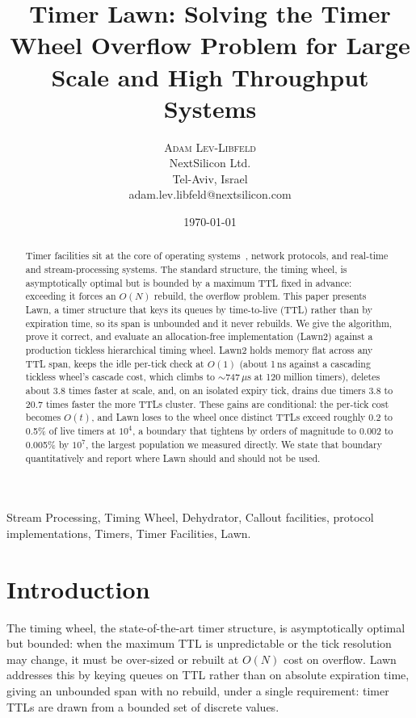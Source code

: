 \documentclass[conference]{IEEEtran}
\title{Timer Lawn: Solving the Timer Wheel Overflow Problem for Large Scale and High Throughput Systems}
\author{
	\textsc{Adam Lev-Libfeld} \\[1ex]
	\normalsize NextSilicon Ltd. \\
	\normalsize Tel-Aviv, Israel \\
	\normalsize{adam.lev.libfeld@nextsilicon.com}
}
\date{\today}
\begin{document}
\maketitle

\begin{abstract}
Timer facilities sit at the core of operating systems~\cite{BSD}, network protocols, and real-time and stream-processing systems. The standard structure, the timing wheel, is asymptotically optimal but is bounded by a maximum TTL fixed in advance: exceeding it forces an $O(N)$ rebuild, the overflow problem. This paper presents Lawn, a timer structure that keys its queues by time-to-live (TTL) rather than by expiration time, so its span is unbounded and it never rebuilds. We give the algorithm, prove it correct, and evaluate an allocation-free implementation (Lawn2) against a production tickless hierarchical timing wheel. Lawn2 holds memory flat across any TTL span, keeps the idle per-tick check at $O(1)$ (about 1\,ns against a cascading tickless wheel's cascade cost, which climbs to $\sim$747\,$\mu$s at 120 million timers), deletes about 3.8 times faster at scale, and, on an isolated expiry tick, drains due timers 3.8 to 20.7 times faster the more TTLs cluster. These gains are conditional: the per-tick cost becomes $O(t)$, and Lawn loses to the wheel once distinct TTLs exceed roughly 0.2 to 0.5\% of live timers at $10^4$, a boundary that tightens by orders of magnitude to 0.002 to 0.005\% by $10^7$, the largest population we measured directly. We state that boundary quantitatively and report where Lawn should and should not be used.
\end{abstract}

\begin{IEEEkeywords}
Stream Processing, Timing Wheel, Dehydrator, Callout facilities, protocol implementations, Timers, Timer Facilities, Lawn.
\end{IEEEkeywords}

\section{Introduction}
The timing wheel, the state-of-the-art timer structure, is asymptotically optimal but bounded: when the maximum TTL is unpredictable or the tick resolution may change, it must be over-sized or rebuilt at $O(N)$ cost on overflow. Lawn addresses this by keying queues on TTL rather than on absolute expiration time, giving an unbounded span with no rebuild, under a single requirement: timer TTLs are drawn from a bounded set of discrete values.
\end{document}

